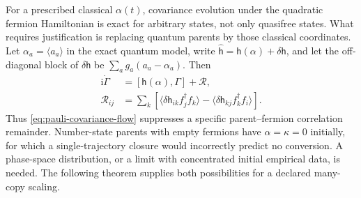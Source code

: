 \documentclass[11pt,a4paper,oneside]{book}
\theoremstyle{plain}
\theoremstyle{definition}
\theoremstyle{remark}
\newcommand{\ii}{\mathrm i}
\begin{document}
For a prescribed classical $\alpha(t)$, covariance evolution under the
quadratic fermion Hamiltonian is exact for arbitrary states, not only
quasifree states.  What requires justification is replacing quantum
parents by those classical coordinates.  Let
$\alpha_a=\langle a_a\rangle$ in the exact quantum model, write
$\widehat{\mathsf h}=\mathsf h(\alpha)+\delta\mathsf h$, and let the
off-diagonal block of $\delta\mathsf h$ be
$\sum_a g_a(a_a-\alpha_a)$.  Then
\begin{equation}
 \begin{split}
 \ii\dot\Gamma&=[\mathsf h(\alpha),\Gamma]+\mathcal R,\\
 \mathcal R_{ij}&=\sum_k\left[
 \langle\delta\mathsf h_{ik}f_j^\dagger f_k\rangle
 -\langle\delta\mathsf h_{kj}f_k^\dagger f_i\rangle\right].
 \end{split}
 \label{eq:covariance-mixed-residual}
\end{equation}
Thus \eqref{eq:pauli-covariance-flow} suppresses a specific
parent--fermion correlation remainder.  Number-state parents with
empty fermions have $\alpha=\kappa=0$ initially, for which a
single-trajectory closure would incorrectly predict no conversion.
A phase-space distribution, or a limit with concentrated initial
empirical data, is needed.  The following theorem supplies both
possibilities for a declared many-copy scaling.
\end{document}
